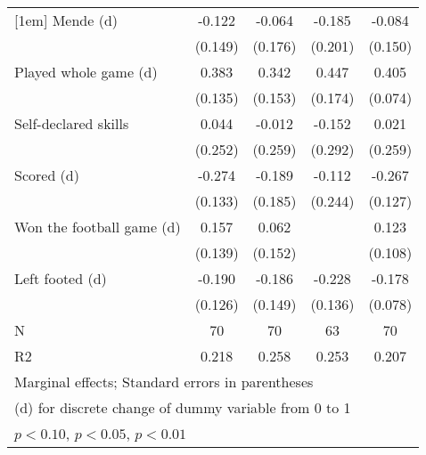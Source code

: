 {\begin{tabular}{l*{4}{c}}
[1em]
Mende (d)           &      -0.122         &      -0.064         &      -0.185         &      -0.084         \\
                    &     (0.149)         &     (0.176)         &     (0.201)         &     (0.150)         \\
[1em]
Played whole game (d)&       0.383\sym{***}&       0.342\sym{**} &       0.447\sym{**} &       0.405\sym{***}\\
                    &     (0.135)         &     (0.153)         &     (0.174)         &     (0.074)         \\
[1em]
Self-declared skills&       0.044         &      -0.012         &      -0.152         &       0.021         \\
                    &     (0.252)         &     (0.259)         &     (0.292)         &     (0.259)         \\
[1em]
Scored (d)          &      -0.274\sym{**} &      -0.189         &      -0.112         &      -0.267\sym{**} \\
                    &     (0.133)         &     (0.185)         &     (0.244)         &     (0.127)         \\
[1em]
Won the football game (d)&       0.157         &       0.062         &                     &       0.123         \\
                    &     (0.139)         &     (0.152)         &                     &     (0.108)         \\
[1em]
Left footed (d)     &      -0.190         &      -0.186         &      -0.228\sym{*}  &      -0.178\sym{**} \\
                    &     (0.126)         &     (0.149)         &     (0.136)         &     (0.078)         \\
\hline
N                   &          70         &          70         &          63         &          70         \\
R2                  &       0.218         &       0.258         &       0.253         &       0.207         \\
\hline\hline
\multicolumn{5}{l}{\footnotesize Marginal effects; Standard errors in parentheses}\\
\multicolumn{5}{l}{\footnotesize  (d) for discrete change of dummy variable from 0 to 1}\\
\multicolumn{5}{l}{\footnotesize \sym{*} \(p<0.10\), \sym{**} \(p<0.05\), \sym{***} \(p<0.01\)}\\
\end{tabular}
}
